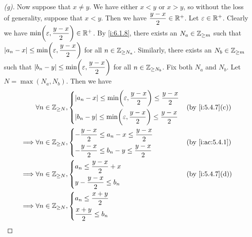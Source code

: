 \begin{proof}[(g)]
  Now suppose that \(x \neq y\).
  We have either \(x < y\) or \(x > y\), so without the loss of generality, suppose that \(x < y\).
  Then we have \(\dfrac{y - x}{2} \in \mathbb{R}^+\).
  Let \(\varepsilon \in \mathbb{R}^+\).
  Clearly we have \(\min\pa{\varepsilon, \dfrac{y - x}{2}} \in \R^+\).
  By \cref{i:6.1.8}, there exists an \(N_a \in \mathbb{Z}_{\geq m}\) such that \(\abs{a_n - x} \leq \min\pa{\varepsilon, \dfrac{y - x}{2}}\) for all \(n \in \mathbb{Z}_{\geq N_a}\).
  Similarly, there exists an \(N_b \in \mathbb{Z}_{\geq m}\) such that \(\abs{b_n - y} \leq \min\pa{\varepsilon, \dfrac{y - x}{2}}\) for all \(n \in \mathbb{Z}_{\geq N_b}\).
  Fix both \(N_a\) and \(N_b\).
  Let \(N = \max(N_a, N_b)\).
  Then we have
  \begin{align*}
             & \forall n \in \Z_{\geq N}, \begin{dcases}
                                            \abs{a_n - x} \leq \min\pa{\varepsilon, \dfrac{y - x}{2}} \leq \dfrac{y - x}{2} \\
                                            \abs{b_n - y} \leq \min\pa{\varepsilon, \dfrac{y - x}{2}} \leq \dfrac{y - x}{2}
                                          \end{dcases} &  & \by{i:5.4.7}[c] \\
    \implies & \forall n \in \Z_{\geq N}, \begin{dcases}
                                            -\dfrac{y - x}{2} \leq a_n - x \leq \dfrac{y - x}{2} \\
                                            -\dfrac{y - x}{2} \leq b_n - y \leq \dfrac{y - x}{2}
                                          \end{dcases}                                   &  & \by{i:ac:5.4.1}                    \\
    \implies & \forall n \in \Z_{\geq N}, \begin{dcases}
                                            a_n \leq \dfrac{y - x}{2} + x \\
                                            y - \dfrac{y - x}{2} \leq b_n
                                          \end{dcases}                                                 &  & \by{i:5.4.7}[d]      \\
    \implies & \forall n \in \Z_{\geq N}, \begin{dcases}
                                            a_n \leq \dfrac{x + y}{2} \\
                                            \dfrac{x + y}{2} \leq b_n

\end{dcases}
\end{align*}
\end{proof}
